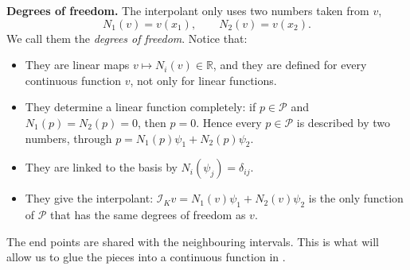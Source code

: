 \begin{example}[The linear Lagrange element in $d = 1$]
    \medskip
    \noindent\textbf{Degrees of freedom.}
    The interpolant only uses two numbers taken from $v$,
    \begin{equation*}
        N_1(v) = v(x_1), \qquad N_2(v) = v(x_2).
    \end{equation*}
    We call them the \emph{degrees of freedom}. Notice that:
    \begin{itemize}
        \item They are linear maps $v \mapsto N_i(v) \in \mathbb R$, and they are defined for every continuous function $v$, not only for linear functions.
        \item They determine a linear function completely: if $p \in \mathcal P$ and $N_1(p) = N_2(p) = 0$, then $p = 0$.
              Hence every $p \in \mathcal P$ is described by two numbers, through $p = N_1(p) \psi_1 + N_2(p) \psi_2$.
        \item They are linked to the basis by $N_i(\psi_j) = \delta_{ij}$.
        \item They give the interpolant: $\mathcal I_K v = N_1(v) \psi_1 + N_2(v) \psi_2$ is the only function of $\mathcal P$ that has the same degrees of freedom as $v$.
    \end{itemize}
    The end points are shared with the neighbouring intervals. This is what will allow us to glue the pieces into a continuous function in .
\end{example}

